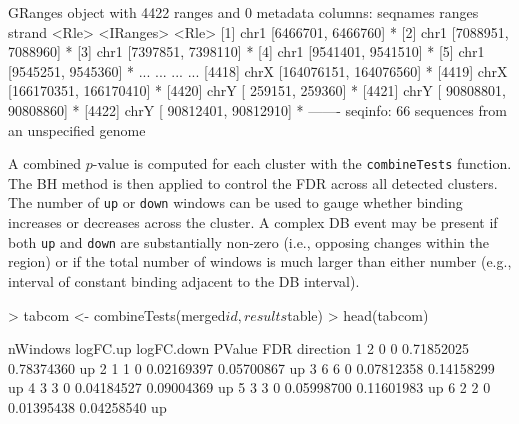 \documentclass[12pt]{report}
\renewenvironment{Schunk}{\vspace{0pt}}{\vspace{0pt}}
\newcommand{\code}[1]{{\small\texttt{#1}}}
\begin{document}
\begin{Schunk}
\begin{Soutput}
GRanges object with 4422 ranges and 0 metadata columns:
         seqnames                 ranges strand
            <Rle>              <IRanges>  <Rle>
     [1]     chr1     [6466701, 6466760]      *
     [2]     chr1     [7088951, 7088960]      *
     [3]     chr1     [7397851, 7398110]      *
     [4]     chr1     [9541401, 9541510]      *
     [5]     chr1     [9545251, 9545360]      *
     ...      ...                    ...    ...
  [4418]     chrX [164076151, 164076560]      *
  [4419]     chrX [166170351, 166170410]      *
  [4420]     chrY [   259151,    259360]      *
  [4421]     chrY [ 90808801,  90808860]      *
  [4422]     chrY [ 90812401,  90812910]      *
  -------
  seqinfo: 66 sequences from an unspecified genome
\end{Soutput}
\end{Schunk}

A combined $p$-value is computed for each cluster with the \code{combineTests} function.
The BH method is then applied to control the FDR across all detected clusters.
The number of \code{up} or \code{down} windows can be used to gauge whether binding increases or decreases across the cluster.
A complex DB event may be present if both \code{up} and \code{down} are substantially non-zero (i.e., opposing changes within the region) or if the total number of windows is much larger than either number (e.g., interval of constant binding adjacent to the DB interval).

\begin{Schunk}
\begin{Sinput}
> tabcom <- combineTests(merged$id, results$table)
> head(tabcom)
\end{Sinput}
\begin{Soutput}
  nWindows logFC.up logFC.down     PValue        FDR direction
1        2        0          0 0.71852025 0.78374360        up
2        1        1          0 0.02169397 0.05700867        up
3        6        6          0 0.07812358 0.14158299        up
4        3        3          0 0.04184527 0.09004369        up
5        3        3          0 0.05998700 0.11601983        up
6        2        2          0 0.01395438 0.04258540        up
\end{Soutput}
\end{Schunk}
\end{document}
